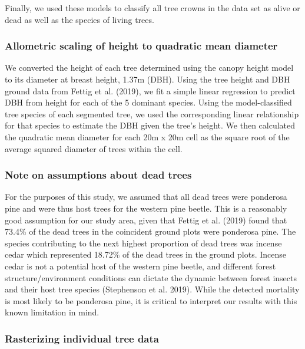 \documentclass[]{article}
\begin{document}
Finally, we used these models to classify all tree crowns in the data
set as alive or dead as well as the species of living trees.

\subsubsection{Allometric scaling of height to quadratic mean
diameter}\label{allometric-scaling-of-height-to-quadratic-mean-diameter}

We converted the height of each tree determined using the canopy height
model to its diameter at breast height, 1.37m (DBH). Using the tree
height and DBH ground data from Fettig et al. (2019), we fit a simple
linear regression to predict DBH from height for each of the 5 dominant
species. Using the model-classified tree species of each segmented tree,
we used the corresponding linear relationship for that species to
estimate the DBH given the tree's height. We then calculated the
quadratic mean diameter for each 20m x 20m cell as the square root of
the average squared diameter of trees within the cell.

\subsubsection{Note on assumptions about dead
trees}\label{note-on-assumptions-about-dead-trees}

For the purposes of this study, we assumed that all dead trees were
ponderosa pine and were thus host trees for the western pine beetle.
This is a reasonably good assumption for our study area, given that
Fettig et al. (2019) found that 73.4\% of the dead trees in the
coincident ground plots were ponderosa pine. The species contributing to
the next highest proportion of dead trees was incense cedar which
represented 18.72\% of the dead trees in the ground plots. Incense cedar
is not a potential host of the western pine beetle, and different forest
structure/environment conditions can dictate the dynamic between forest
insects and their host tree species (Stephenson et al. 2019). While the
detected mortality is most likely to be ponderosa pine, it is critical
to interpret our results with this known limitation in mind.

\subsubsection{Rasterizing individual tree
data}\label{rasterizing-individual-tree-data}
\end{document}
